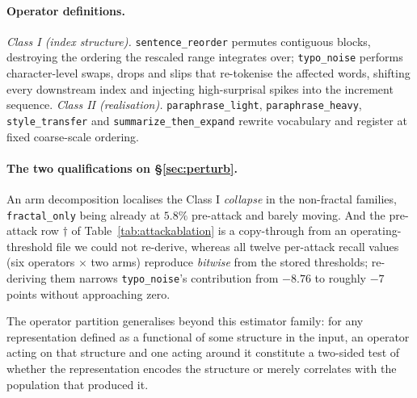 \documentclass{article}
\newcommand{\arm}[1]{\texttt{#1}}
\begin{document}
\paragraph{Operator definitions.} \emph{Class I (index structure).}
\texttt{sentence\_reorder} permutes contiguous blocks, destroying the ordering the
rescaled range integrates over; \texttt{typo\_noise} performs character-level swaps,
drops and slips that re-tokenise the affected words, shifting every downstream index
and injecting high-surprisal spikes into the increment sequence. \emph{Class II
(realisation).} \texttt{paraphrase\_light}, \texttt{paraphrase\_heavy},
\texttt{style\_transfer} and \texttt{summarize\_then\_expand} rewrite vocabulary and
register at fixed coarse-scale ordering.

\paragraph{The two qualifications on \S\ref{sec:perturb}.} An arm decomposition
localises the Class I \emph{collapse} in the non-fractal families,
\arm{fractal\_only} being already at $5.8\%$ pre-attack and barely moving. And the
pre-attack row $\dagger$ of Table~\ref{tab:attackablation} is a copy-through from an
operating-threshold file we could not re-derive, whereas all twelve per-attack
recall values (six operators $\times$ two arms) reproduce \emph{bitwise} from the
stored thresholds; re-deriving them
narrows \texttt{typo\_noise}'s contribution from $-8.76$ to roughly $-7$ points
without approaching zero.

The operator partition generalises beyond this estimator family: for any
representation defined as a functional of some structure in the input, an operator
acting on that structure and one acting around it constitute a two-sided test of
whether the representation encodes the structure or merely correlates with the
population that produced it.
\end{document}
